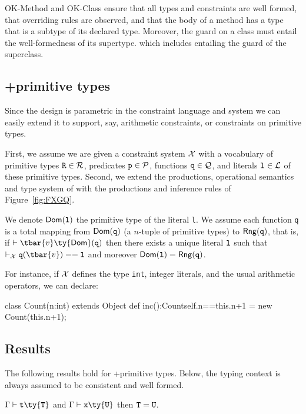 {\sc OK-Method} and {\sc OK-Class} ensure that all types and constraints are well formed, that overriding rules are observed, and that the body of a method has a type that is a subtype of its declared type. Moreover, the guard on a class must entail the well-formedness of its supertype. which includes entailing the guard of the superclass.


\subsection{\FXG+primitive types}\label{sec:Q}

Since the \FXG design is parametric in the constraint language and system we can easily extend it to support, say, arithmetic constraints, or constraints on primitive types.

First, we assume we are given a constraint system $\cal X$ with a vocabulary of primitive types ${\tt R}\in\cal R$, predicates ${\tt p}\in\cal P$, functions ${\tt q}\in\cal Q$, and literals ${\tt l}\in\cal L$ of these primitive types. Second, we extend the productions, operational semantics and type system of \FXG with the productions and inference rules of Figure~\ref{fig:FXGQ}.

We denote $\Dom({\tt l})$ the primitive type of the literal {\tt l}. We assume each function {\tt q}
is a total mapping from ${\sf Dom}({\tt q})$ (a $n$-tuple of primitive types) to $\Img({\tt q})$, that is, if $\vdash \tbar{v}\ty{\sf Dom}({\tt q})$ then there exists a unique literal $\tt l$ such that $\vdashQ {\tt q}(\tbar{v})=={\tt l}$ and moreover $\Dom({\tt l})=\Img({\tt q})$.

For instance, if $\cal X$ defines the type {\tt int}, integer literals, and the usual arithmetic operators, we can declare:

\begin{xten}
class Count(n:int) extends Object {
  def inc():Count{self.n==this.n+1} =
  	new Count(this.n+1);
}
\end{xten}


\subsection{Results}
\label{sec:results}
The following results hold for \FXG+primitive types. Below, the typing context is always assumed to be consistent and well formed.


\begin{theorem}
$\Gamma\vdash {\tt t}\ty{\tt T}$ and $\Gamma\vdash {\tt x}\ty{\tt U}$ then ${\tt T}={\tt U}$.
\end{theorem}

